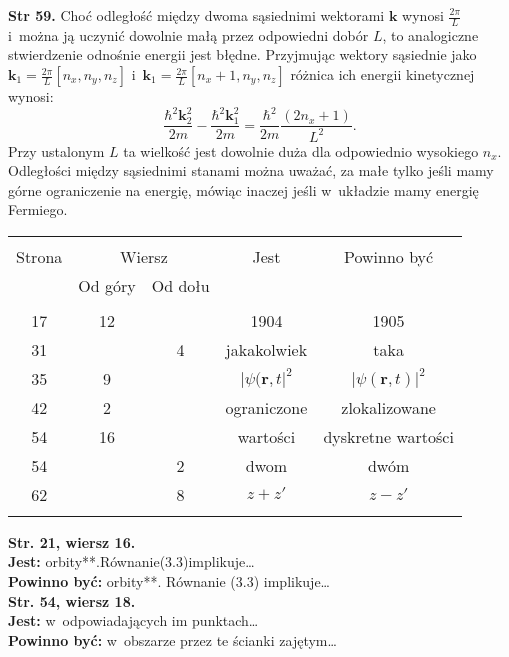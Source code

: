\documentclass[a4paper,11pt]{article}
\begin{document}
 \textbf{Str 59.} Choć odległość między dwoma sąsiednimi
  wektorami $\mathbf{k}$ wynosi $\frac{ 2 \pi }{ L }$ i~można ją
  uczynić dowolnie małą przez odpowiedni dobór $L$, to analogiczne
  stwierdzenie odnośnie energii jest błędne. Przyjmując wektory
  sąsiednie jako
  $\mathbf{k}_{ 1 } = \frac{ 2 \pi }{ L } [ n_{ x }, n_{ y }, n_{ z }
  ]$
  i~$\mathbf{k}_{ 1 } = \frac{ 2 \pi }{ L } [ n_{ x } + 1, n_{ y },
  n_{ z } ]$ różnica ich energii kinetycznej wynosi:
  \begin{displaymath}
    \frac{ \hbar^{ 2 } \mathbf{k}_{ 2 }^{ 2 } }{ 2 m } - \frac{ \hbar^{ 2 } \mathbf{k}_{ 1 }^{ 2 } }{ 2 m } = \frac{ \hbar^{ 2 } }{ 2 m } \frac{ ( 2 n_{ x } + 1 ) }{ L^{ 2 } }.
  \end{displaymath}
  Przy ustalonym $L$ ta wielkość jest dowolnie duża dla odpowiednio
  wysokiego $n_{ x }$. Odległości między sąsiednimi stanami można
  uważać, za małe tylko jeśli mamy górne ograniczenie na energię,
  mówiąc inaczej jeśli w~układzie mamy energię Fermiego.





\begin{center}

  \begin{tabular}{|c|c|c|c|c|}
    \hline
    & \multicolumn{2}{c|}{} & & \\
    Strona & \multicolumn{2}{c|}{Wiersz} & Jest
                              & Powinno być \\ \cline{2-3}
    & Od góry & Od dołu & & \\
    \hline
    & & & & \\
    17 & 12 & & 1904 & 1905 \\
    31 & & 4 & jakakolwiek & taka \\
    35 & 9 & & $| \psi( \mathbf{r}, t |^{ 2 }$ & $| \psi( \mathbf{r}, t ) |^{ 2 }$ \\
    42 & 2 & & ograniczone & zlokalizowane \\
    54 & 16 & & wartości & dyskretne wartości \\
    54 & & 2 & dwom & dwóm \\
    62 & & 8 & $z + z'$ & $z - z'$ \\
    & & & & \\
    \hline
  \end{tabular}

\end{center}


\noindent
\textbf{Str. 21, wiersz 16.} \\
\textbf{Jest:} orbity**.Równanie(3.3)implikuje\ldots \\
\textbf{Powinno być:} orbity**. Równanie (3.3) implikuje\ldots \\
\textbf{Str. 54, wiersz 18.} \\
\textbf{Jest:} w~odpowiadających im punktach\ldots  \\
\textbf{Powinno być:} w~obszarze przez te ścianki zajętym\ldots \\
\end{document}
